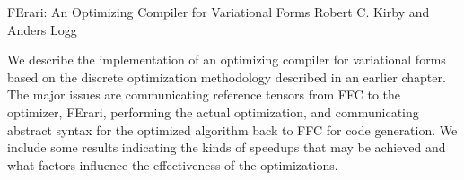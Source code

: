               {FErari: An Optimizing Compiler for Variational Forms}
              {Robert C. Kirby and Anders Logg}

\editornote{[kirby-3]}

We describe the implementation of an optimizing compiler for
variational forms based on the discrete optimization methodology
described in an earlier chapter. The major issues are communicating
reference tensors from FFC to the optimizer, FErari, performing the
actual optimization, and communicating abstract syntax for the
optimized algorithm back to FFC for code generation.  We include some
results indicating the kinds of speedups that may be achieved and what
factors influence the effectiveness of the optimizations.
